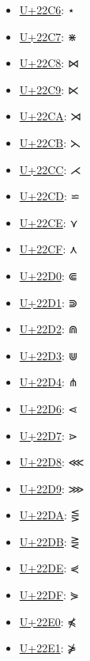 \begin{itemize}
	\item \href{https://www.compart.com/en/unicode/U+22C6}{U+22C6}: ⋆
	\item \href{https://www.compart.com/en/unicode/U+22C7}{U+22C7}: ⋇
	\item \href{https://www.compart.com/en/unicode/U+22C8}{U+22C8}: ⋈
	\item \href{https://www.compart.com/en/unicode/U+22C9}{U+22C9}: ⋉
	\item \href{https://www.compart.com/en/unicode/U+22CA}{U+22CA}: ⋊
	\item \href{https://www.compart.com/en/unicode/U+22CB}{U+22CB}: ⋋
	\item \href{https://www.compart.com/en/unicode/U+22CC}{U+22CC}: ⋌
	\item \href{https://www.compart.com/en/unicode/U+22CD}{U+22CD}: ⋍
	\item \href{https://www.compart.com/en/unicode/U+22CE}{U+22CE}: ⋎
	\item \href{https://www.compart.com/en/unicode/U+22CF}{U+22CF}: ⋏
	\item \href{https://www.compart.com/en/unicode/U+22D0}{U+22D0}: ⋐
	\item \href{https://www.compart.com/en/unicode/U+22D1}{U+22D1}: ⋑
	\item \href{https://www.compart.com/en/unicode/U+22D2}{U+22D2}: ⋒
	\item \href{https://www.compart.com/en/unicode/U+22D3}{U+22D3}: ⋓
	\item \href{https://www.compart.com/en/unicode/U+22D4}{U+22D4}: ⋔
	\item \href{https://www.compart.com/en/unicode/U+22D6}{U+22D6}: ⋖
	\item \href{https://www.compart.com/en/unicode/U+22D7}{U+22D7}: ⋗
	\item \href{https://www.compart.com/en/unicode/U+22D8}{U+22D8}: ⋘
	\item \href{https://www.compart.com/en/unicode/U+22D9}{U+22D9}: ⋙
	\item \href{https://www.compart.com/en/unicode/U+22DA}{U+22DA}: ⋚
	\item \href{https://www.compart.com/en/unicode/U+22DB}{U+22DB}: ⋛
	\item \href{https://www.compart.com/en/unicode/U+22DE}{U+22DE}: ⋞
	\item \href{https://www.compart.com/en/unicode/U+22DF}{U+22DF}: ⋟
	\item \href{https://www.compart.com/en/unicode/U+22E0}{U+22E0}: ⋠
	\item \href{https://www.compart.com/en/unicode/U+22E1}{U+22E1}: ⋡

\end{itemize}
